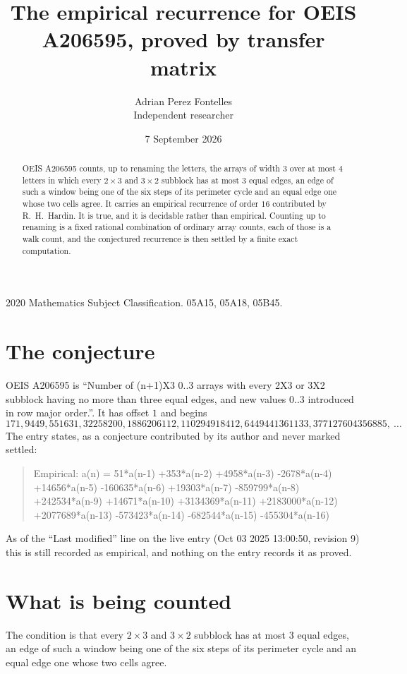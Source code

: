 \documentclass[11pt,a4paper]{article}
\title{The empirical recurrence for OEIS A206595, proved by transfer matrix}
\author{Adrian Perez Fontelles\\ \small Independent researcher}
\date{7 September 2026}
\theoremstyle{plain}
\theoremstyle{definition}
\begin{document}
\maketitle

\begin{abstract}
OEIS A206595 counts, up to renaming the letters, the arrays of width $3$ over at most $4$
letters in which every $2\times3$ and $3\times2$ subblock has at most $3$ equal edges, an edge of such a window being one of the six steps of its perimeter cycle and an equal edge one whose two cells agree. It carries an empirical recurrence of order $16$ contributed by
R.~H.~Hardin. It is true, and it is decidable rather than empirical. Counting up to renaming is
a fixed rational combination of ordinary array counts, each of those is a walk count, and the
conjectured recurrence is then settled by a finite exact computation.
\end{abstract}

\noindent\small 2020 Mathematics Subject Classification. 05A15, 05A18, 05B45.\normalsize

\section{The conjecture}

OEIS A206595 is ``Number of (n+1)X3 0..3 arrays with every 2X3 or 3X2 subblock having no more than three equal edges, and new values 0..3 introduced in row major order.''. It has offset $1$ and begins
\[
171, 9449, 551631, 32258200, 1886206112, 110294918412, 6449441361133, 377127604356885,\ \dots
\]
The entry states, as a conjecture contributed by its author and never marked settled:
\begin{quote}
Empirical: a(n) = 51*a(n-1) +353*a(n-2) +4958*a(n-3) -2678*a(n-4) +14656*a(n-5) -160635*a(n-6) +19303*a(n-7) -859799*a(n-8) +242534*a(n-9) +14671*a(n-10) +3134369*a(n-11) +2183000*a(n-12) +2077689*a(n-13) -573423*a(n-14) -682544*a(n-15) -455304*a(n-16)
\end{quote}
As of the ``Last modified'' line on the live entry (Oct 03 2025 13:00:50, revision 9) this is still
recorded as empirical, and nothing on the entry records it as proved.

\section{What is being counted}

The condition is that every $2\times3$ and $3\times2$ subblock has at most $3$ equal edges, an edge of such a window being one of the six steps of its perimeter cycle and an equal edge one whose two cells agree.
\end{document}

